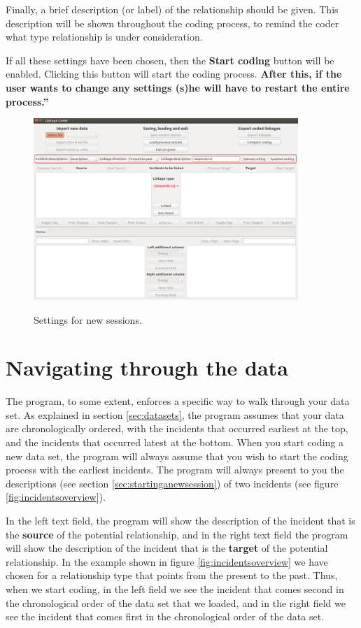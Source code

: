 \documentclass{memoir}
\begin{document}
Finally, a brief description (or label) of the relationship should be given. This description will be shown throughout the coding process, to remind the coder what type relationship is under consideration.

If all these settings have been chosen, then the \textbf{Start coding} button will be enabled. Clicking this button will start the coding process. \textbf{After this, if the user wants to change any settings (s)he will have to restart the entire process.''}

\begin{figure}[h!]
  \centering
  \caption{Settings for new sessions.}
  \includegraphics[width=100mm]{Screenshot_4.pdf}
  \label{fig:settings}
\end{figure}

\section{Navigating through the data}
\label{sec:navigatingdata}

The program, to some extent, enforces a specific way to walk through your data set. As explained in section \ref{sec:datasets}, the program assumes that your data are chronologically ordered, with the incidents that occurred earliest at the top, and the incidents that occurred latest at the bottom. When you start coding a new data set, the program will always assume that you wish to start the coding process with the earliest incidents. The program will always present to you the descriptions (see section \ref{sec:startinganewsession}) of two incidents (see figure \ref{fig:incidentsoverview}).

In the left text field, the program will show the description of the incident that is the \textbf{source} of the potential relationship, and in the right text field the program will show the description of the incident that is the \textbf{target} of the potential relationship. In the example shown in figure \ref{fig:incidentsoverview} we have chosen for a relationship type that points from the present to the past. Thus, when we start coding, in the left field we see the incident that comes second in the chronological order of the data set that we loaded, and in the right field we see the incident that comes first in the chronological order of the data set.
\end{document}
